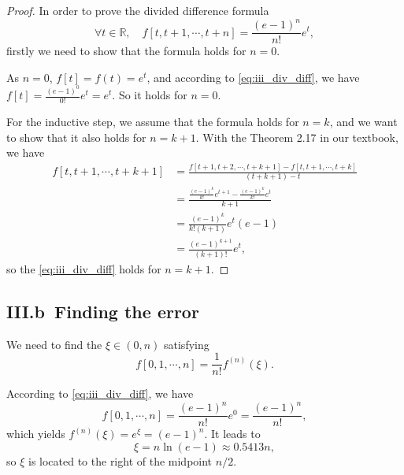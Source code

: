 \documentclass[a4paper]{article}
\begin{document}
\begin{proof}
  In order to prove the divided difference formula
  \begin{equation}
    \forall t \in \mathbb{R}, \quad f[t, t + 1, \cdots, t + n] = \frac{(e - 1)^n}{n!}e^t,
    \label{eq:iii_div_diff}
  \end{equation}
  firstly we need to show that the formula holds for $n = 0$. 
  
  As $n = 0$, $f[t] = f(t) = e^t$, and according to \cref{eq:iii_div_diff}, we have $f[t] = \frac{(e - 1)^0}{0!}e^t = e^t$. So it holds for $n = 0$.
  
  For the inductive step, we assume that the formula holds for $n = k$, and we want to show that it also holds for $n = k + 1$. 
  With the Theorem 2.17 in our textbook, we have
  \begin{equation}
    \begin{aligned}
      f[t, t + 1, \cdots, t + k + 1] &= \frac{f[t + 1, t + 2, \cdots, t + k + 1] - f[t, t + 1, \cdots, t + k]}{(t + k + 1) - t} \\
      &= \frac{\frac{(e - 1)^k}{k!} e^{t + 1} - \frac{(e - 1)^k}{k!} e^t}{k + 1} \\
      &= \frac{(e - 1)^k}{k!(k + 1)}e^t(e - 1) \\
      &= \frac{(e - 1)^{k + 1}}{(k + 1)!}e^t,
    \end{aligned}
    \label{eq:iii_induction}
  \end{equation}
  so the \cref{eq:iii_div_diff} holds for $n = k + 1$.
\end{proof}

\subsection*{III.b\ Finding the error}

We need to find the $\xi \in (0, n)$ satisfying 
\begin{equation}
  f[0, 1, \cdots, n] = \frac{1}{n!}f^{(n)}(\xi).
  \label{eq:iii_xi}
\end{equation}

According to \cref{eq:iii_div_diff}, we have
\begin{equation}
  f[0, 1, \cdots, n] = \frac{(e - 1)^n}{n!}e^0 = \frac{(e - 1)^n}{n!},
  \label{eq:iii_f_n}
\end{equation}
which yields $f^{(n)}(\xi) = e^{\xi} = (e - 1)^n$. It leads to 
\begin{equation}
  \xi = n \ln(e - 1) \approx 0.5413 n,
  \label{eq:iii_xi_approx}
\end{equation}
so $\xi$ is located to the right of the midpoint $n/2$.
\end{document}

